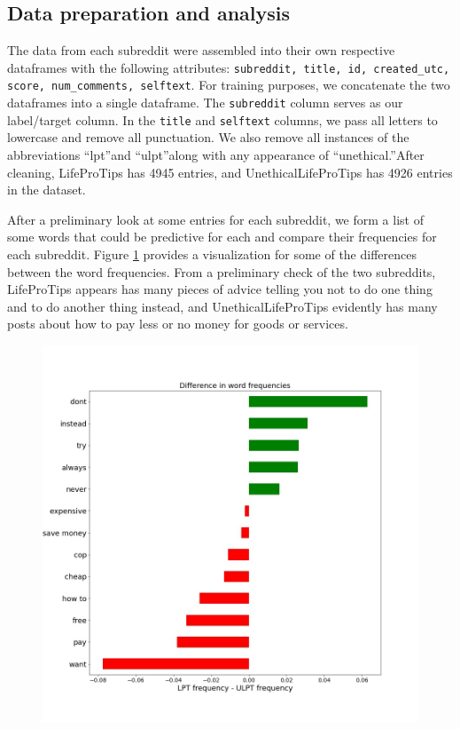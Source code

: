 \documentclass{amsart}
\theoremstyle{definition}
\theoremstyle{remark}
\newcommand{\tql}{\textquotedblleft}
\newcommand{\tqr}{\textquotedblright}
\begin{document}
\subsection{Data preparation and analysis}

The data from each subreddit were assembled into their own respective dataframes with the following attributes: \texttt{subreddit, title, id, created\_utc, score, num\_comments, selftext}.  For training purposes, we concatenate the two dataframes into a single dataframe.  The \texttt{subreddit} column serves as our label/target column. In the \texttt{title} and \texttt{selftext} columns, we pass all letters to lowercase and remove all punctuation.  We also remove all instances of the abbreviations \tql lpt\tqr and \tql ulpt\tqr along with any appearance of \tql unethical.\tqr After cleaning, LifeProTips has 4945 entries, and UnethicalLifeProTips has 4926 entries in the dataset.

After a preliminary look at some entries for each subreddit, we form a list of some words that could be predictive for each and compare their frequencies for each subreddit.  Figure \ref{fig:word_freq_diff} provides a visualization for some of the differences between the word frequencies.  From a preliminary check of the two subreddits, LifeProTips appears has many pieces of advice telling you not to do one thing and to do another thing instead, and UnethicalLifeProTips evidently has many posts about how to pay less or no money for goods or services.

\begin{figure}
\centering
\includegraphics[width=12cm]{prelim_word_freq.jpeg}
\label{fig:word_freq_diff} 
\end{figure}
\end{document}
